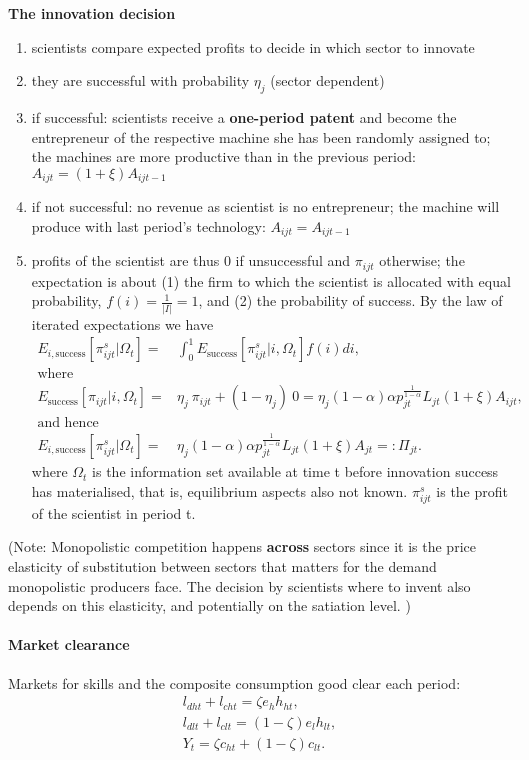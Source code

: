  \textbf{The innovation decision}
 \begin{enumerate}
 	\item scientists compare expected profits to decide in which sector to innovate
 	\item they are successful with probability $\eta_j$ (sector dependent)
 	\item if successful: scientists receive a \textbf{one-period patent} and become the entrepreneur of the respective machine she has been randomly assigned to; the machines are more productive than in the previous period: $A_{ijt}=(1+\xi)A_{ijt-1}$
 	\item if not successful: no revenue as scientist is no entrepreneur; the machine will produce with last period's  technology: $A_{ijt}=A_{ijt-1}$
 	\item profits of the scientist are thus 0 if unsuccessful and $\pi_{ijt}$ otherwise; the expectation is about (1) the firm to which the scientist is allocated with equal probability, $f(i)=\frac{1}{|I|}=1$, and (2) the probability of success. By the law of iterated expectations we have
 	\begin{align*}
 	E_{i,\text{success}}[\pi^s_{ijt}| \Omega_t]=& \int_{0}^{1}E_\text{success}[\pi^s_{ijt}|i, \Omega_t]f(i)di,\\ \text{where}&\\
 	E_\text{success}[\pi_{ijt}|i, \Omega_t]=& \eta_j\  \pi_{ijt}+(1-\eta_j)\ 0=\eta_j (1-\alpha)\alpha p_{jt}^\frac{1}{1-\alpha}L_{jt}(1+\xi)A_{ijt},\\
 	\text{and hence}&\\
 	E_{i,\text{success}}[\pi^s_{ijt}| \Omega_t]=&\eta_j (1-\alpha)\alpha p_{jt}^\frac{1}{1-\alpha}L_{jt}(1+\xi)A_{jt}=: \Pi_{jt}.
 	\end{align*}
 	where $\Omega_t$ is the information set available at time t before innovation success has materialised, that is, equilibrium aspects also not known. $\pi^s_{ijt}$ is the profit of the scientist in period t. 
 	
 \end{enumerate}
 (Note: Monopolistic competition happens \textbf{across} sectors since it is the price elasticity of substitution between sectors that matters for the demand monopolistic producers face.
 The decision by scientists where to invent also depends on this elasticity, and potentially on the satiation level. 
 )
 
\paragraph{Market clearance}
Markets for skills and the composite consumption good clear each period:
\begin{align}
l_{dht}+l_{cht}=\zeta e_h h_{ht},\\
l_{dlt}+l_{clt}=(1-\zeta) e_l h_{lt},\\
Y_t=\zeta c_{ht}+(1-\zeta)c_{lt}.
\end{align}

